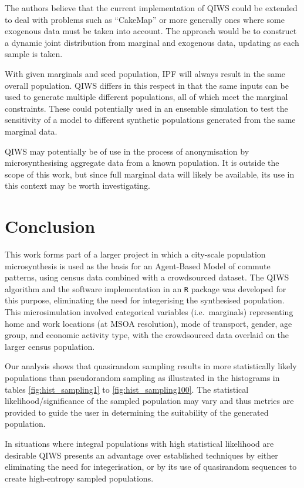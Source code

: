 \documentclass{JASSS}
\begin{document}
The authors believe that the current implementation of QIWS could be extended to deal with problems such as ``CakeMap'' or more generally ones where some exogenous data must be taken into account. The approach would be to construct a dynamic joint distribution from marginal and exogenous data, updating as each sample is taken.

With given marginals and seed population, IPF will always result in the same overall population. QIWS differs in this respect in that the same inputs can be used to generate multiple different populations, all of which meet the marginal constraints. These could potentially used in an ensemble simulation to test the sensitivity of a model to different synthetic populations generated from the same marginal data.

QIWS may potentially be of use in the process of anonymisation by microsynthesising aggregate data from a known population. It is outside the scope of this work, but since full
marginal data will likely be available, its use in this context may be
worth investigating.

\section{Conclusion}\label{conclusion}

This work forms part of a larger project in which a city-scale
population microsynthesis is used as the basis for an Agent-Based Model
of commute patterns, using census data combined with a crowdsourced
dataset. The QIWS algorithm and the software implementation in an
\texttt{R} package was developed for this purpose, eliminating the need
for integerising the synthesised population. This microsimulation
involved categorical variables (i.e.~marginals) representing home and
work locations (at MSOA resolution), mode of transport, gender, age
group, and economic activity type, with the crowdsourced data overlaid
on the larger census population.

Our analysis shows that quasirandom sampling results in more statistically likely populations than pseudorandom sampling as illustrated in the histograms in tables \ref{fig:hist_sampling1} to \ref{fig:hist_sampling100}. The statistical likelihood/significance of the sampled population may vary and thus metrics are provided to guide the user in determining the suitability of the generated population.

In situations where integral populations with high statistical likelihood are desirable QIWS presents an
advantage over established techniques by either eliminating the need for integerisation, or by its use of quasirandom sequences to create high-entropy sampled populations.  
\end{document}

